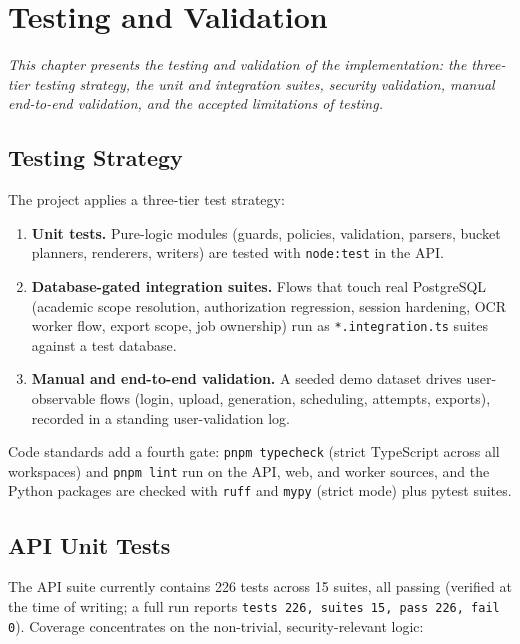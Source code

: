 \chapter{Testing and Validation}
\label{ch:testing}

\begin{center}
\textit{This chapter presents the testing and validation of the
implementation: the three-tier testing strategy, the unit and integration
suites, security validation, manual end-to-end validation, and the accepted
limitations of testing.}
\end{center}

\vspace*{\fill}
\clearpage
\section{Testing Strategy}

\noindent The project applies a three-tier test strategy:

\begin{enumerate}
  \item \textbf{Unit tests.} Pure-logic modules (guards, policies, validation,
  parsers, bucket planners, renderers, writers) are tested with
  \texttt{node:test} in the API.
  \item \textbf{Database-gated integration suites.} Flows that touch real
  PostgreSQL (academic scope resolution, authorization regression, session
  hardening, OCR worker flow, export scope, job ownership) run as
  \texttt{*.integration.ts} suites against a test database.
  \item \textbf{Manual and end-to-end validation.} A seeded demo dataset drives
  user-observable flows (login, upload, generation, scheduling, attempts,
  exports), recorded in a standing user-validation log.
\end{enumerate}

\noindent Code standards add a fourth gate: \texttt{pnpm typecheck} (strict
TypeScript across all workspaces) and \texttt{pnpm lint} run on the API, web,
and worker sources, and the Python packages are checked with \texttt{ruff}
and \texttt{mypy} (strict mode) plus pytest suites.

\section{API Unit Tests}

\noindent The API suite currently contains 226 tests across 15 suites, all
passing (verified at the time of writing; a full run reports
\texttt{tests 226, suites 15, pass 226, fail 0}). Coverage concentrates on the
non-trivial, security-relevant logic:

